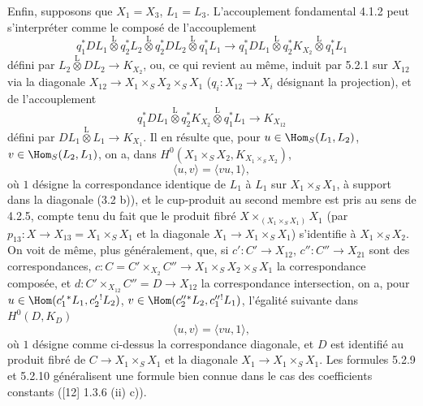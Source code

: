 Enfin, supposons que $X_1=X_3$, $L_1=L_3$. L'accouplement fondamental 4.1.2 peut s'interpréter comme le composé de l'accouplement
\begin{equation}
\tag{5.2.7}
q_1^*DL_1\overset{\mathrm{L}}{\otimes}q_2^*L_2\overset{\mathrm{L}}{\otimes}q_2^*DL_2\overset{\mathrm{L}}{\otimes}q_1^*L_1
\longrightarrow
q_1^*DL_1\overset{\mathrm{L}}{\otimes}q_2^*K_{X_2}\overset{\mathrm{L}}{\otimes}q_1^*L_1
\end{equation}
défini par $L_2\overset{\mathrm{L}}{\otimes}DL_2\to K_{X_2}$, ou, ce qui revient au même, induit par 5.2.1 sur $X_{12}$ via la diagonale $X_{12}\to X_1\times_SX_2\times_SX_1$ ($q_i:X_{12}\to X_i$ désignant la projection), et de l'accouplement
\begin{equation}
\tag{5.2.8}
q_1^*DL_1\overset{\mathrm{L}}{\otimes}q_2^*K_{X_2}\overset{\mathrm{L}}{\otimes}q_1^*L_1\longrightarrow K_{X_{12}}
\end{equation}
défini par $DL_1\overset{\mathrm{L}}{\otimes}L_1\to K_{X_1}$. Il en résulte que, pour $u\in\Hom_S(L_1,L_2)$, $v\in\Hom_S(L_2,L_1)$, on a, dans $H^0(X_1\times_SX_2,K_{X_1\times_SX_2})$,
\begin{equation}
\tag{5.2.9}
\langle u,v\rangle=\langle vu,1\rangle,
\end{equation}
où $1$ désigne la correspondance identique de $L_1$ à $L_1$ sur $X_1\times_SX_1$, à support dans la diagonale (3.2 b)), et le cup-produit au second membre est pris au sens de 4.2.5, compte tenu du fait que le produit fibré $X\times_{(X_1\times_SX_1)}X_1$ (par $p_{13}:X\to X_{13}=X_1\times_SX_1$ et la diagonale $X_1\to X_1\times_SX_1$) s'identifie à $X_1\times_SX_2$. On voit de même, plus généralement, que, si $c':C'\to X_{12}$, $c'':C''\to X_{21}$
sont des correspondances, $c:C=C'\times_{X_2}C''\to X_1\times_SX_2\times_SX_1$ la 
correspondance composée, et $d:C'\times_{X_{12}}C''=D\to X_{12}$ la correspondance intersection, on a, pour $u\in\Hom(c_1'{}^*L_1,c_2'{}^!L_2)$, $v\in\Hom(c_2''{}^*L_2,c_1''{}^!L_1)$, l'égalité suivante dans $H^0(D,K_D)$
\begin{equation}
\tag{5.2.10}
\langle u,v\rangle=\langle vu,1\rangle,
\end{equation}
où $1$ désigne comme ci-dessus la correspondance diagonale, et $D$ est identifié au produit fibré de $C\to X_1\times_SX_1$ et la diagonale $X_1\to X_1\times_SX_1$. Les formules 5.2.9 et 5.2.10 généralisent une formule bien connue dans le cas des coefficients constants ([12] 1.3.6 (ii) c)).

